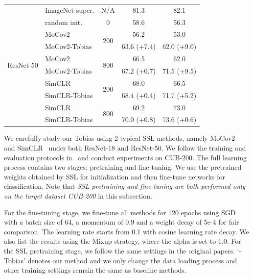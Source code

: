 \documentclass[letterpaper]{article} %
\def\pt{\phantom{0}}
\begin{document}
\begin{table}
\begin{tabular}{l|l|c|c|c}
		\multirow{10}{*}{ResNet-50}& ImageNet super.&N/A &    81.3 \pt\pt\pt\pt\pt&82.1 \pt\pt\pt\pt\pt\\
		\cline{2-5}
		& random init. &0& 58.6 \pt\pt\pt\pt\pt&56.3 \pt\pt\pt\pt\pt\\
		\cline{2-5}
		& MoCov2 & \multirow{2}{*}{200}     &56.2 \pt\pt\pt\pt\pt &53.0 \pt\pt\pt\pt\pt \\
		&MoCov2-Tobias&&63.6 (\textcolor{grassgreen}{+7.4})&62.0 (\textcolor{grassgreen}{+9.0})\\
		\cline{2-5}
		& MoCov2 & \multirow{2}{*}{800}   & 66.5 \pt\pt\pt\pt\pt&62.0 \pt\pt\pt\pt\pt\\
		&MoCov2-Tobias&&67.2 (\textcolor{grassgreen}{+0.7})&71.5 (\textcolor{grassgreen}{+9.5})\\
		\cline{2-5}
		& SimCLR & \multirow{2}{*}{200}     &68.0 \pt\pt\pt\pt\pt&66.5 \pt\pt\pt\pt\pt\\
		&SimCLR-Tobias&&68.4 (\textcolor{grassgreen}{+0.4})&71.7 (\textcolor{grassgreen}{+5.2}) \\
		\cline{2-5}
		& SimCLR & \multirow{2}{*}{800}   & 69.2 \pt\pt\pt\pt\pt &73.0 \pt\pt\pt\pt\pt\\
		&SimCLR-Tobias&&70.0 (\textcolor{grassgreen}{+0.8})& 73.6 (\textcolor{grassgreen}{+0.6})\\
		\hline
	\end{tabular}
\end{table}

We carefully study our Tobias using 2 typical SSL methods, namely MoCov2~\citep{mocov2:xinlei:arxiv2020} and SimCLR~\citep{simclr:hinton:ICML20} under both ResNet-18 and ResNet-50. We follow the training and evaluation protocols in~\citep{S3L:cao:arxiv2021} and conduct experiments on CUB-200. The full learning process contains two stages: pretraining and fine-tuning. We use the pretrained weights obtained by SSL for initialization and then fine-tune networks for classification. Note that \textit{SSL pretraining and fine-tuning are both performed only on the target dataset CUB-200} in this subsection.

For the fine-tuning stage, we fine-tune all methods for 120 epochs using SGD with a batch size of 64, a momentum of 0.9 and a weight decay of 5e-4 for fair comparison. The learning rate starts from 0.1 with cosine learning rate decay. We also list the results using the Mixup strategy, where the alpha is set to 1.0. For the SSL pretraining stage, we follow the same settings in the original papers. `-Tobias' denotes our method and we only change the data loading process and other training settings remain the same as baseline methods.
\end{document}
